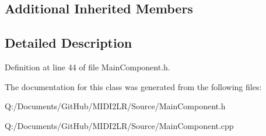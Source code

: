 \subsection*{Additional Inherited Members}


\subsection{Detailed Description}


Definition at line 44 of file Main\+Component.\+h.



The documentation for this class was generated from the following files\+:\begin{DoxyCompactItemize}
\item 
Q\+:/\+Documents/\+Git\+Hub/\+M\+I\+D\+I2\+L\+R/\+Source/Main\+Component.\+h\item 
Q\+:/\+Documents/\+Git\+Hub/\+M\+I\+D\+I2\+L\+R/\+Source/Main\+Component.\+cpp\end{DoxyCompactItemize}
